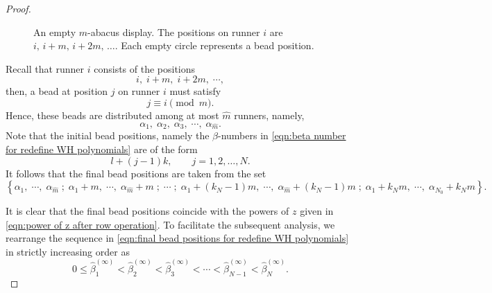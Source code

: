\documentclass[preprint,3p,10pt]{elsarticle}
\theoremstyle{definition}
\begin{document}
\begin{proof}
\begin{figure}[htbp]
\caption{An empty \(m\)-abacus display. The positions on runner \(i\) are \(i,\, i+m,\, i+2m,\, \dots\). Each empty circle represents a bead position.}
\label{fig:m-abacus-empty}
\end{figure}

Recall that runner \(i\) consists of the positions
\begin{equation}
    i,\; i+m,\; i+2m,\; \cdots,
\end{equation}
then, a bead at position \(j\) on runner \(i\) must satisfy
\begin{equation}
    j \equiv i \pmod{m}.
\end{equation}
Hence, these beads are distributed among at most \(\hat m\) runners, namely,
\begin{equation}
    \alpha_1,\; \alpha_2,\; \alpha_3,\; \cdots,\; \alpha_{\hat m}.
\end{equation}
Note that the initial bead positions, namely the \(\beta\)-numbers in \eqref{eqn:beta number for redefine WH polynomials} are of the form
\begin{equation}
l+(j-1)k, \qquad j=1,2,\ldots,N.
\end{equation}
It follows that the final bead positions are taken from the set
\begin{equation}\label{eqn:final bead positions for redefine WH polynomials}
\left\{
\alpha_1,
\; \cdots, \;
\alpha_{\hat m}
\; ; \;
\alpha_1+m,
\; \cdots, \;
\alpha_{\hat m}+m
\; ; \; \cdots \; ; \;
\alpha_1+(k_N-1)m,
\; \cdots, \;
\alpha_{\hat m}+(k_N-1)m
\; ; \;
\alpha_1+k_Nm,
\; \cdots, \;
\alpha_{N_0}+k_Nm
\right\}.
\end{equation}

It is clear that the final bead positions coincide with the powers of \(z\) given in \eqref{eqn:power of z after row operation}. To facilitate the subsequent analysis, we rearrange the sequence in \eqref{eqn:final bead positions for redefine WH polynomials} in strictly increasing order as
\begin{equation}\label{eqn:rearrange sequence hat_beta_n}
    0\le\widehat{\beta}^{(\infty)}_1< \widehat{\beta}^{(\infty)}_2< \widehat{\beta}^{(\infty)}_3<\cdots< \widehat{\beta}^{(\infty)}_{N-1}< \widehat{\beta}^{(\infty)}_N.
\end{equation}




\end{proof}
\end{document}

